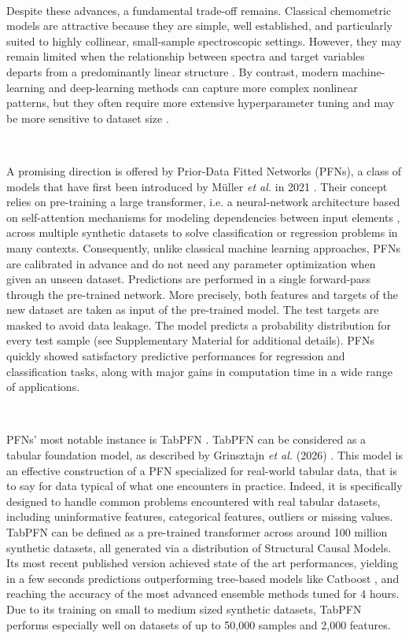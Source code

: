 \documentclass{article}
\begin{document}
~

Despite these advances, a fundamental trade-off remains. Classical chemometric models are attractive because they are simple, well established, and particularly suited to highly collinear, small-sample spectroscopic settings. However, they may remain limited when the relationship between spectra and target variables departs from a predominantly linear structure \cite{limits_linear_nirs}. By contrast, modern machine-learning and deep-learning methods can capture more complex nonlinear patterns, but they often require more extensive hyperparameter tuning and may be more sensitive to dataset size \cite{cat_vs_dl_tabular, dl_nirs_complex_tuning}.

~

A promising direction is offered by Prior-Data Fitted Networks (PFNs), a class of models that have first been introduced by Müller \textit{et al.} in 2021 \cite{muller_transformers_2024}. Their concept relies on pre-training a large transformer, i.e. a neural-network architecture based on self-attention mechanisms for modeling dependencies between input elements \cite{Vaswani2017Attention}, across multiple synthetic datasets to solve classification or regression problems in many contexts. Consequently, unlike classical machine learning approaches, PFNs are calibrated in advance and do not need any parameter optimization when given an unseen dataset. Predictions are performed in a single forward-pass through the pre-trained network. More precisely, both features and targets of the new dataset are taken as input of the pre-trained model. The test targets are masked to avoid data leakage. The model predicts a probability distribution for every test sample (see Supplementary Material for additional details). PFNs quickly showed satisfactory predictive performances for regression and classification tasks, along with major gains in computation time in a wide range of applications.

~ 

PFNs' most notable instance is TabPFN \cite{hollmann_tabpfn_2023, Hollmann2025TabPFN}. TabPFN can be considered as a tabular foundation model, as described by Grinsztajn \textit{et al.} (2026) \cite{grinsztajn_tabpfn-25_2026}. This model is an effective construction of a PFN specialized for real-world tabular data, that is to say for data typical of what one encounters in practice. Indeed, it is specifically designed to handle common problems encountered with real tabular datasets, including uninformative features, categorical features, outliers or missing values. TabPFN can be defined as a pre-trained transformer across around 100 million synthetic datasets, all generated via a distribution of Structural Causal Models. Its most recent published version \cite{grinsztajn_tabpfn-25_2026} achieved state of the art performances, yielding in a few seconds predictions outperforming tree-based models like Catboost \cite{Prokhorenkova2019CatBoost}, and reaching the accuracy of the most advanced ensemble methods \cite{Erickson2020AutoGluon} tuned for 4 hours. Due to its training on small to medium sized synthetic datasets, TabPFN performs especially well on datasets of up to 50,000 samples and 2,000 features.
\end{document}
